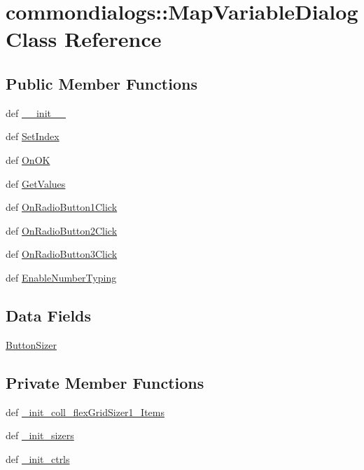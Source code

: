 \hypertarget{classcommondialogs_1_1MapVariableDialog}{
\section{commondialogs::Map\-Variable\-Dialog Class Reference}
\label{classcommondialogs_1_1MapVariableDialog}
}
\subsection*{Public Member Functions}
\begin{CompactItemize}
\item 
def \hyperlink{classcommondialogs_1_1MapVariableDialog_1d6b6313208c4cfaf2243bbdf59d92d9}{\_\-\_\-init\_\-\_\-}
\item 
def \hyperlink{classcommondialogs_1_1MapVariableDialog_bdab86c958f3e219882e7852b301dc4b}{Set\-Index}
\item 
def \hyperlink{classcommondialogs_1_1MapVariableDialog_31ebc1dd65eeec19147b3a5202d1e6a4}{On\-OK}
\item 
def \hyperlink{classcommondialogs_1_1MapVariableDialog_c447e821ce5690bdcd4f55d3b6e82cc0}{Get\-Values}
\item 
def \hyperlink{classcommondialogs_1_1MapVariableDialog_63c2f5b4975384238c3b2aeabaeb6a11}{On\-Radio\-Button1Click}
\item 
def \hyperlink{classcommondialogs_1_1MapVariableDialog_6d8ff9549883ff0b0313891884e1183a}{On\-Radio\-Button2Click}
\item 
def \hyperlink{classcommondialogs_1_1MapVariableDialog_64b1004d131ad794053dd456431501ca}{On\-Radio\-Button3Click}
\item 
def \hyperlink{classcommondialogs_1_1MapVariableDialog_d971712aba98f0888bb5210073dd8737}{Enable\-Number\-Typing}
\end{CompactItemize}
\subsection*{Data Fields}
\begin{CompactItemize}
\item 
\hyperlink{classcommondialogs_1_1MapVariableDialog_142e2cd20328fd573126f5b60e8cec20}{Button\-Sizer}
\end{CompactItemize}
\subsection*{Private Member Functions}
\begin{CompactItemize}
\item 
def \hyperlink{classcommondialogs_1_1MapVariableDialog_912b9c33a957a879918c2dacfe12652b}{\_\-init\_\-coll\_\-flex\-Grid\-Sizer1\_\-Items}
\item 
def \hyperlink{classcommondialogs_1_1MapVariableDialog_c4327f2bda8902fd3267551603128090}{\_\-init\_\-sizers}
\item 
def \hyperlink{classcommondialogs_1_1MapVariableDialog_8ac9451c0ae750a90ecaeedbf04bab64}{\_\-init\_\-ctrls}
\end{CompactItemize}


